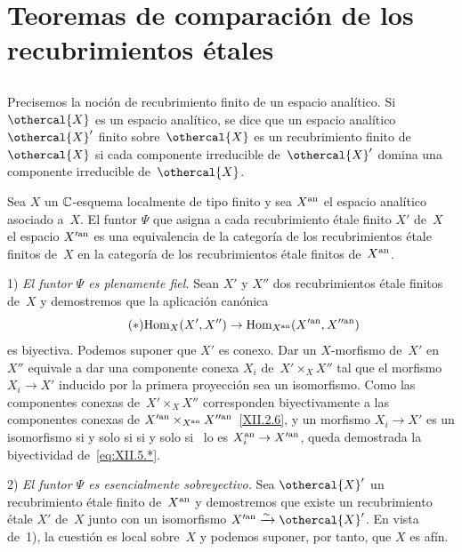 
\section{Teoremas de comparación de los recubrimientos étales}
\label{XII.5}
\setcounter{subsection}{-1}
\subsection{}
\label{XII.5.0}
Precisemos la noción de recubrimiento finito de un espacio analítico.
%
Si $\othercal{X}$ es un espacio analítico, se dice que un espacio analítico
$\othercal{X}'$ finito sobre~$\othercal{X}$ es un recubrimiento finito de
$\othercal{X}$ si cada componente irreducible de~$\othercal{X}'$ domina
una componente irreducible de~$\othercal{X}$.


\begin{theoreme}
\label{XII.5.1}
%
%
Sea $X$ un $\mathbb C$-esquema localmente de tipo finito y sea $X^{\mathrm{an}}$
el espacio analítico asociado a~$X$. El funtor $\Psi$ que asigna
a cada recubrimiento étale finito $X'$ de~$X$ el espacio
$X^{\prime\mathrm{an}}$ es una equivalencia
de la categoría de los recubrimientos étale finitos de~$X$ en
la categoría de los recubrimientos étale finitos de~$X^{\mathrm{an}}$.
\end{theoreme}

1) \emph{El funtor $\Psi$ es plenamente fiel.} Sean $X'$ y
$X''$ dos recubrimientos étale finitos de~$X$ y demostremos que
la aplicación canónica
\begin{equation*}
\label{eq:XII.5.*}
\tag{$*$} { \operatorname{Hom}_{X}(X',X'') \to
\operatorname{Hom}_{X^{\mathrm{an}}}(X^{\prime\mathrm{an}},X^{\prime\prime\mathrm{an}}) }
\end{equation*}
es biyectiva. Podemos suponer que $X'$ es conexo. Dar un
$X$-morfismo de~$X'$ en $X''$ equivale a dar una
componente conexa $X_i$ de~$X'\times_XX''$ tal que el morfismo
$X_i\to X'$ inducido por la primera proyección sea un
isomorfismo. Como las componentes conexas de~$X'\times_XX''$
corresponden biyectivamente a las componentes conexas de
$X^{\prime\mathrm{an}}\times_{X^{\mathrm{an}}}X^{\prime\prime\mathrm{an}}$~\eqref{XII.2.6}, y un
morfismo $X_i\to X'$ es un isomorfismo
{si y solo si}
{si y solo si}%
~lo es $X_i^{\mathrm{an}}\to X^{\prime\mathrm{an}}$, queda demostrada la
biyectividad de~\eqref{eq:XII.5.*}.

2) \emph{El funtor $\Psi$ es esencialmente sobreyectivo.} Sea
$\othercal{X}'$ un recubrimiento étale finito de~$X^{\mathrm{an}}$ y demostremos
que existe un recubrimiento étale $X'$ de~$X$ junto con
un isomorfismo $X^{\prime\an}\isomto\othercal{X}'$. En vista de~1), la
cuestión es local sobre~$X$ y podemos suponer, por tanto, que $X$ es afín.

